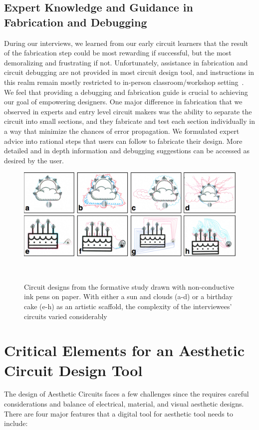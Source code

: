 \documentclass{sigchi}
\begin{document}
\subsection{Expert Knowledge and Guidance in Fabrication and Debugging}
During our interviews, we learned from our early circuit learners that the result of the fabrication step could be most rewarding if successful, but the most demoralizing and frustrating if not. Unfortunately, assistance in fabrication and circuit debugging are not provided in most circuit design tool, and instructions in this realm remain mostly restricted to in-person classroom/workshop setting~\cite{Klemmer:2004ul}. We feel that providing a debugging and fabrication guide is crucial to achieving our goal of empowering designers. One major difference in fabrication that we observed in experts and entry level circuit makers was the ability to separate the circuit into small sections, and they fabricate and test each section individually in a way that minimize the chances of error propagation. We formulated expert advice into rational steps that users can follow to fabricate their design. More detailed and in depth information and debugging suggestions can be accessed as desired by the user.  

\begin{figure}
\centering
  \includegraphics[width=1\columnwidth]{figures/Ellustrate_figures_formative_user_design}
  \caption{Circuit designs from the formative study drawn with non-conductive ink pens on paper. With either a sun and clouds (a-d) or a birthday cake (e-h) as an artistic scaffold, the complexity of the interviewees' circuits varied considerably }~\label{fig:formative_user_design}
  \vspace{-16pt}
\end{figure}

\section{Critical Elements for an Aesthetic Circuit Design Tool}
The design of Aesthetic Circuits faces a few challenges since the requires careful considerations and balance of electrical, material, and visual aesthetic designs. There are four major features that a digital tool for aesthetic tool needs to include: 
\end{document}
